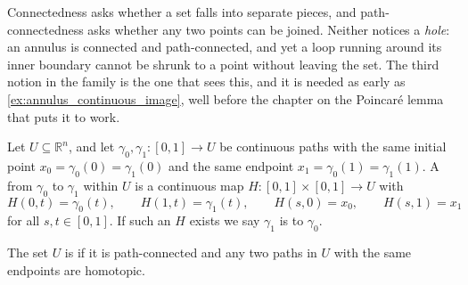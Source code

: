 Connectedness asks whether a set falls into separate pieces, and path-connectedness asks whether
any two points can be joined. Neither notices a \emph{hole}: an annulus is connected and
path-connected, and yet a loop running around its inner boundary cannot be shrunk to a point
without leaving the set. The third notion in the family is the one that sees this, and it is
needed as early as \cref{ex:annulus_continuous_image}, well before the chapter on the Poincaré
lemma that puts it to work.

\begin{definition}
\label{def:simply_connected}
Let $U \subseteq \mathbb{R}^n$, and let $\gamma_0, \gamma_1 : [0,1] \to U$ be continuous paths
with the same initial point $x_0 = \gamma_0(0) = \gamma_1(0)$ and the same endpoint
$x_1 = \gamma_0(1) = \gamma_1(1)$. A   from $\gamma_0$ to
$\gamma_1$ within $U$ is a continuous map $H : [0,1]\times[0,1] \to U$ with
\[H(0,t) = \gamma_0(t), \qquad H(1,t) = \gamma_1(t), \qquad
  H(s,0) = x_0, \qquad H(s,1) = x_1\]
for all $s,t \in [0,1]$. If such an $H$ exists we say $\gamma_1$ is 
 to $\gamma_0$.

The set $U$ is   if it is
path-connected and any two paths in $U$ with the same endpoints are homotopic.
\end{definition}

